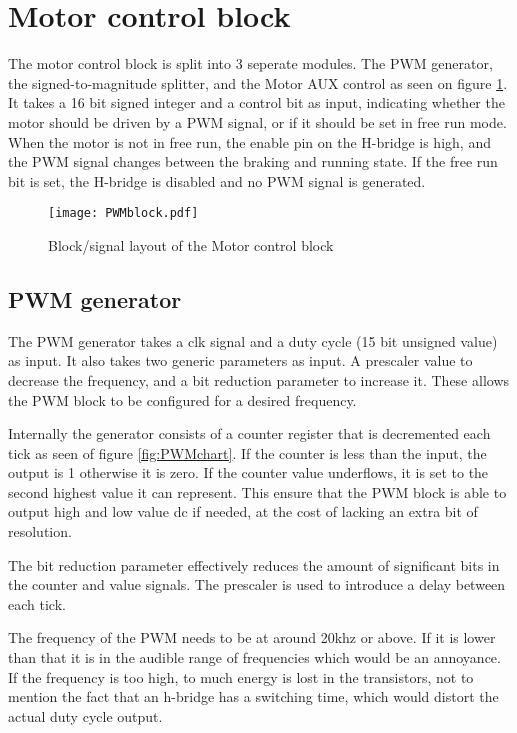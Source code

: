 \section{Motor control block}


The motor control block is split into 3 seperate modules.
The PWM generator, the signed-to-magnitude splitter, and the Motor AUX control as seen on figure \ref{fig:PWMblock}.
It takes a 16 bit signed integer and a control bit as input, indicating whether the motor should be driven by a PWM signal, or if it should be set in free run mode. 
When the motor is not in free run, the enable pin on the H-bridge is high, and the PWM signal changes between the braking and running state. If the free run bit is set, the H-bridge is disabled and no PWM signal is generated.

\begin{figure}[htb]
\texttt{[image: PWMblock.pdf]}
\caption{Block/signal layout of the Motor control block}
\label{fig:PWMblock}
\end{figure}

\subsection{PWM generator}
The PWM generator takes a clk signal and a duty cycle (15 bit unsigned value) as input. It also takes two generic parameters as input. A prescaler value to decrease the frequency, and a bit reduction parameter to increase it. These allows the PWM block to be configured for a desired frequency.

Internally the generator consists of a counter register that is decremented each tick as seen of figure \ref{fig:PWMchart}. If the counter is less than the input, the output is 1 otherwise it is zero.
If the counter value underflows, it is set to the second highest value it can represent. This ensure that the PWM block is able to output high and low value dc if needed, at the cost of lacking an extra bit of resolution.

The bit reduction parameter effectively reduces the amount of significant bits in the counter and value signals.
The prescaler is used to introduce a delay between each tick.

The frequency of the PWM needs to be at around 20khz or above. If it is lower than that it is in the audible range of frequencies which would be an annoyance. If the frequency is too high, to much energy is lost in the transistors, not to mention the fact that an h-bridge has a switching time, which would distort the actual duty cycle output.

